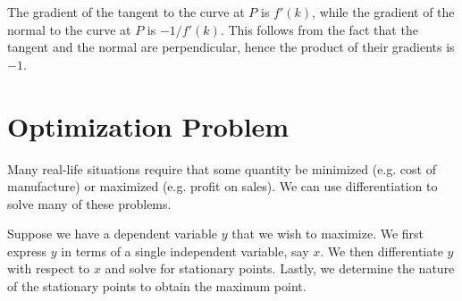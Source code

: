 \begin{figure}[H]
    \centering
    \caption{}
\end{figure}

The gradient of the tangent to the curve at $P$ is $f'(k)$, while the gradient of the normal to the curve at $P$ is $-1/f'(k)$. This follows from the fact that the tangent and the normal are perpendicular, hence the product of their gradients is $-1$.

\section{Optimization Problem}

Many real-life situations require that some quantity be minimized (e.g. cost of manufacture) or maximized (e.g. profit on sales). We can use differentiation to solve many of these problems.

\begin{recipe}
    Suppose we have a dependent variable $y$ that we wish to maximize. We first express $y$ in terms of a single independent variable, say $x$. We then differentiate $y$ with respect to $x$ and solve for stationary points. Lastly, we determine the nature of the stationary points to obtain the maximum point.
\end{recipe}

